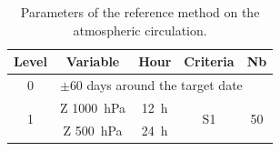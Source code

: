 \documentclass{ametsoc}
\begin{document}
%

\begin{table}[htbp]
	\footnotesize
	\caption{Parameters of the reference method on the atmospheric circulation.}
	\begin{center}
		\begin{tabular}{ccccc}
			\hline \textbf{Level} & \textbf{Variable} & \textbf{Hour} & \textbf{Criteria} & \textbf{Nb} \\ 
			\hline 
			0 & \multicolumn{4}{l}{$\pm 60$ days around the target date} \\
			\hline 
			\multirow{2}{*}{1} & Z 1000~hPa & 12~h & \multirow{2}{*}{S1} & \multirow{2}{*}{50} \\
			& Z 500~hPa & 24~h & & \\ 
			\hline 
		\end{tabular} 
	\end{center}
	\label{table:params_R1}
\end{table}
\end{document}
